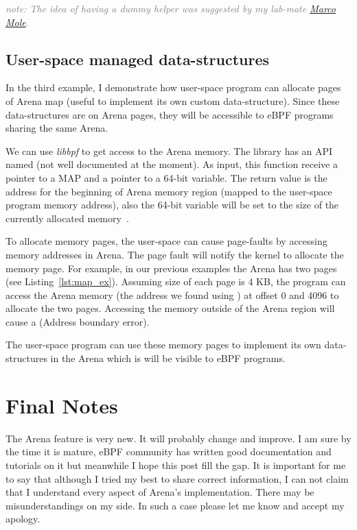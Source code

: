 \documentclass{article} \usepackage{graphicx}
\begin{document}
\textcolor{gray}{\textit{note: The idea of having a dummy helper was suggested
by my lab-mate \href{https://github.com/marcomole00/}{Marco Mole}.}}


\subsection{User-space managed data-structures}

In the third example, I demonstrate how user-space program can allocate pages
of Arena map (useful to implement its own custom data-structure). Since these
data-structures are on Arena pages, they will be accessible to eBPF programs
sharing the same Arena.

We can use \emph{libbpf} to get access to the Arena memory.
The library has an API named  (not well documented
at the moment). As input, this function receive a pointer to a MAP and a pointer
to a 64-bit variable. The return value is the address for the beginning of Arena
memory region (mapped to the user-space program memory address), also the
64-bit variable will be set to the size of the currently allocated
memory~\cite{libbpf_initial_value}.

To allocate memory pages, the user-space can cause page-faults by accessing
memory addresses in Arena. The page fault will notify the kernel to allocate
the memory page. For example, in our previous examples the Arena has two pages
(see Listing~\ref{lst:map_ex}). Assuming size of each page is 4 KB, the program
can access the Arena memory (the address we found using
) at offset 0 and 4096 to allocate the two pages.
Accessing the memory outside of the Arena region will cause a 
(Address boundary error).

The user-space program can use these memory pages to implement its own
data-structures in the Arena which is will be visible to eBPF programs.


\section{Final Notes}

The Arena feature is very new. It will probably change and improve. I am sure
by the time it is mature, eBPF community has written good documentation and
tutorials on it but meanwhile I hope this post fill the gap. It is important
for me to say that although I tried my best to share correct information, I can
not claim that I understand every aspect of Arena's implementation. There may
be misunderstandings on my side. In such a case please let me know and accept
my apology.
\end{document}
